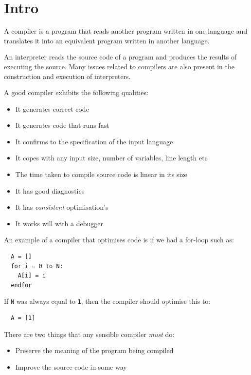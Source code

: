 

\section{Intro}

A compiler is a program that reads another program written in one language and
translates it into an equivalent program written in another language.

An interpreter reads the source code of a program and produces the results of
executing the source. Many issues related to compilers are also present in the
construction and execution of interpreters.

A good compiler exhibits the following qualities:

\begin{itemize}
  \item It generates correct code
  \item It generates code that runs fast
  \item It confirms to the specification of the input language
  \item It copes with any input size, number of variables, line length etc
  \item The time taken to compile source code is linear in its size
  \item It has good diagnostics
  \item It has \textit{consistent} optimisation's
  \item It works will with a debugger
\end{itemize}

An example of a compiler that optimises code is if we had a for-loop such as:

\begin{verbatim}
  A = []
  for i = 0 to N:
    A[i] = i
  endfor
\end{verbatim}

If \texttt{N} was always equal to \texttt{1}, then the compiler should optimise
this to:

\begin{verbatim}
  A = [1]
\end{verbatim}

There are two things that any sensible compiler \textit{must} do:

\begin{itemize}
  \item Preserve the meaning of the program being compiled
  \item Improve the source code in some way
\end{itemize}

